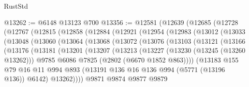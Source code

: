 \begin{lexlean}{RustStd}
\begin{coremodule}
@13262 := @6148 @13123 @700
@13356 := @12581
    (@12639
      (@12685
        (@12728
          (@12767
            (@12815
              (@12858
                (@12884
                  (@12921
                    (@12954
                      (@12983
                        (@13012
                          (@13033
                            (@13048
                              (@13060
                                (@13064
                                  (@13068
                                    (@13072
                                      (@13076
                                        (@13103
                                          (@13121
                                            (@13166
                                              (@13176
                                                (@13181
                                                  (@13201
                                                    (@13207
                                                      (@13213
                                                        (@13227
                                                          (@13230 (@13245 (@13260 @13262)))
                                                          @9785
                                                          @6086
                                                          @7825
                                                          (@2802 (@6670 @1852 @863))))
                                                      (@13183
                                                        @155
                                                        @79
                                                        @16
                                                        @11
                                                        @994
                                                        @893
                                                        (@13191
                                                          @136
                                                          @16
                                                          @136
                                                          @994
                                                          (@5771 (@13196 @136))
                                                          @6142)
                                                        @13262))))
                                                @9871
                                                @9874
                                                @9877
                                                @9879

\end{coremodule}
\end{lexlean}
